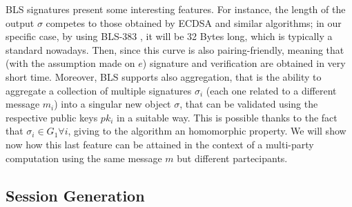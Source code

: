 \documentclass[twocolumn]{article}
\begin{document}
BLS signatures present some interesting features. For instance, the length of the output $\sigma$ competes to those obtained by ECDSA and similar algorithms; in our specific case, by using BLS-383 \citep{bls383}, it will be 32 Bytes long, which is typically a standard nowadays. Then, since this curve is also pairing-friendly, meaning that (with the assumption made on $e$) signature and verification are obtained in very short time. Moreover, BLS supports also aggregation, that is the ability to aggregate a collection of multiple signatures $\sigma_i$ (each one related to a different message $m_i$) into a singular new object $\sigma$, that can be validated using the respective public keys $pk_i$ in a suitable way. This is possible thanks to the fact that $\sigma_i\in G_1 \forall i$, giving to the algorithm an homomorphic property. We will show now how this last feature can be attained in the context of a multi-party computation using the same message $m$ but different partecipants.

\subsection*{Session Generation}
\end{document}
